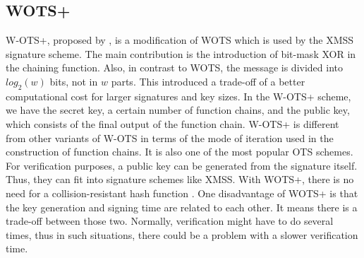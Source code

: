 \subsection{WOTS+}
W-OTS+, proposed by \cite{hulsingWOTSShorterSignatures2013}, is a modification 
 of WOTS which is used by the XMSS signature scheme.
The main contribution is the introduction of bit-mask XOR in the chaining function.
Also, in contrast to WOTS, the message is divided into $log_2(w)$ bits, not in $w$ parts.
This introduced a trade-off of a better computational cost for larger signatures and key sizes.
In the W-OTS+ scheme, we have the secret key, a certain number of function chains, and the public key, which consists of the final output of the function chain.
W-OTS+ is different from other variants of W-OTS in terms of the mode of iteration used in the construction of function chains. 
It is also one of the most popular OTS schemes.
For verification purposes, a public key can be generated from the signature itself.
Thus, they can fit into signature schemes like XMSS.
With WOTS+, there is no need for a collision-resistant hash function
.
One disadvantage of WOTS+ is that the key generation and signing time are related to each other.
It means there is a trade-off between those two.
Normally, verification might have to do several times, thus in such situations, 
there could be a problem with a slower verification time.

